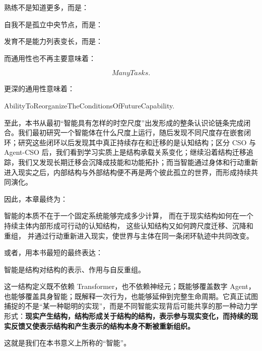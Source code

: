 熟练不是知道更多，而是：

\begin{statementbox}
\centering
{}
\end{statementbox}

自我不是孤立中央节点，而是：

\begin{statementbox}
\centering
{}
\end{statementbox}

发育不是能力列表变长，而是：

\begin{statementbox}
\centering
{}
\end{statementbox}

而通用性也不再主要意味着：

\[
ManyTasks.
\]

更深的通用性意味着：

\begin{statementbox}
AbilityToReorganizeTheConditionsOfFutureCapability.
\end{statementbox}

至此，本书从最初“智能具有怎样的时空尺度”出发形成的整条认识论链条完成闭合。我们最初研究一个智能体在什么尺度上运行，随后发现不同尺度存在嵌套闭环；研究这些闭环以后发现其中真正持续存在和迁移的是认知结构；区分 CSO 与 Agent-CSO 后，我们看到学习实质上是结构承载关系变化；继续沿着结构迁移追踪，我们又发现长期迁移会沉降成技能和功能拓扑；而当智能通过身体和行动重新进入现实之后，内部结构与外部结构便不再是两个彼此孤立的世界，而形成持续共同演化。

因此，本章最终为：

\begin{statementbox}
智能的本质不在于一个固定系统能够完成多少计算，
而在于现实结构如何在一个持续主体内部形成可行动的认知结构，
这些认知结构又如何跨尺度迁移、沉降和重组，
并通过行动重新进入现实，使世界与主体在同一条闭环轨迹中共同改变。
\end{statementbox}

或者，用本书最短的最终表达：

\begin{statementbox}
智能是结构对结构的表示、作用与自反重组。
\end{statementbox}

这一结构定义既不依赖 Transformer，也不依赖神经元；既能够覆盖数字 Agent，也能够覆盖具身智能；既解释一次行为，也能够延伸到完整生命周期。它真正试图捕捉的不是“某一种聪明的实现”，而是不同智能实现背后可能共享的那一种动力学形式：\textbf{现实产生结构，结构形成关于结构的结构，表示参与现实变化，而持续的现实反馈又使表示结构和产生表示的结构本身不断被重新组织。}

这就是我们在本书意义上所称的“智能”。
